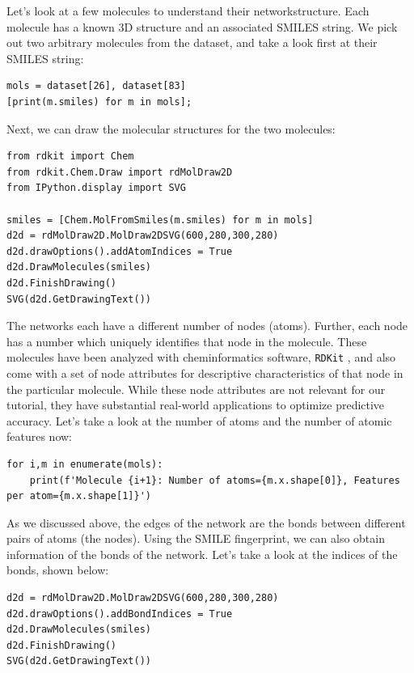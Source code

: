 Let's look at a few molecules to understand their networkstructure. Each molecule has a known 3D structure and an associated SMILES string. We pick out two arbitrary molecules from the dataset, and take a look first at their SMILES string:

\begin{lstlisting}[style=python]
mols = dataset[26], dataset[83]
[print(m.smiles) for m in mols];
\end{lstlisting}

Next, we can draw the molecular structures for the two molecules:

\begin{lstlisting}[style=python]
from rdkit import Chem
from rdkit.Chem.Draw import rdMolDraw2D
from IPython.display import SVG

smiles = [Chem.MolFromSmiles(m.smiles) for m in mols]
d2d = rdMolDraw2D.MolDraw2DSVG(600,280,300,280)
d2d.drawOptions().addAtomIndices = True
d2d.DrawMolecules(smiles)
d2d.FinishDrawing()
SVG(d2d.GetDrawingText())
\end{lstlisting}

The networks each have a different number of nodes (atoms). Further, each node has a number which uniquely identifies that node in the molecule. These molecules have been analyzed with cheminformatics software, \texttt{RDKit} \cite{rdkit}, and also come with a set of node attributes for descriptive characteristics of that node in the particular molecule. While these node attributes are not relevant for our tutorial, they have substantial real-world applications to optimize predictive accuracy. Let's take a look at the number of atoms and the number of atomic features now:

\begin{lstlisting}[style=python]
for i,m in enumerate(mols):
    print(f'Molecule {i+1}: Number of atoms={m.x.shape[0]}, Features per atom={m.x.shape[1]}')
\end{lstlisting}

As we discussed above, the edges of the network are the bonds between different pairs of atoms (the nodes). Using the SMILE fingerprint, we can also obtain information of the bonds of the network. Let's take a look at the indices of the bonds, shown below:

\begin{lstlisting}[style=python]
d2d = rdMolDraw2D.MolDraw2DSVG(600,280,300,280)
d2d.drawOptions().addBondIndices = True
d2d.DrawMolecules(smiles)
d2d.FinishDrawing()
SVG(d2d.GetDrawingText())
\end{lstlisting}

